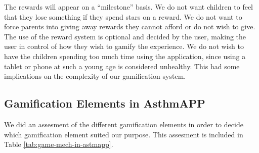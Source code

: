 The rewards will appear on a ``milestone'' basis. We do not want children to feel that they lose something if they spend stars on a reward. We do not want to force parents into giving away rewards they cannot afford or do not wish to give. The use of the reward system is optional and decided by the user, making the user in control of how they wish to gamify the experience. 
We do not wish to have the children spending too much time using the application, since using a tablet or phone at such a young age is considered unhealthy. This had some implications on the complexity of our gamification system. 


\subsection{Gamification Elements in AsthmAPP}
\label{sec:combininggamemechanismsinasthmapp}

We did an assesment of the different gamification elements in order to decide which gamification element suited our purpose. This assesment is included in Table \ref{tab:game-mech-in-astmapp}. 

